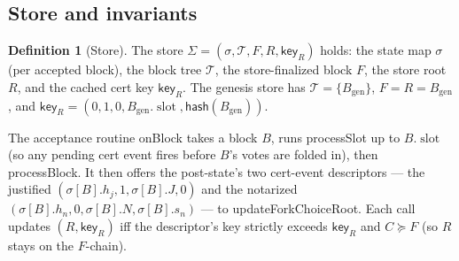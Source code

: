 \documentclass{article}
\newcommand{\genesis}{\ensuremath{B_{\mathrm{gen}}}}
\newcommand{\T}{\ensuremath{\mathcal{T}}}
\newcommand{\slot}{\operatorname{\mathrm{slot}}}
\newcommand{\hash}{\mathsf{hash}}
\newcommand{\key}{\mathsf{key}}
\newcommand{\processSlot}{\textsf{processSlot}\xspace}
\newcommand{\processBlock}{\textsf{processBlock}\xspace}
\newcommand{\onBlock}{\textsf{onBlock}\xspace}
\newcommand{\updateForkChoiceRoot}{\textsf{updateForkChoiceRoot}\xspace}
\theoremstyle{plain}
\theoremstyle{definition}
\newtheorem{definition}[theorem]{Definition}
\theoremstyle{remark}
\begin{document}
\subsection{Store and invariants}

\begin{definition}[Store]\label{def:store}
The store
\(
  \Sigma = (\sigma, \T, F, R, \key_R)
\)
holds: the state map $\sigma$ (per accepted block), the block tree $\T$, the store-finalized block $F$, the store root $R$, and the cached cert key $\key_R$. The genesis store has $\T = \{\genesis\}$, $F = R = \genesis$, and $\key_R = (0, 1, 0, \genesis.\slot, \hash(\genesis))$.
\end{definition}

The acceptance routine \onBlock takes a block $B$, runs \processSlot up to $B.\slot$ (so any pending cert event fires before $B$'s votes are folded in), then \processBlock. It then offers the post-state's two cert-event descriptors --- the justified $(\sigma[B].h_j, 1, \sigma[B].J, 0)$ and the notarized $(\sigma[B].h_n, 0, \sigma[B].N, \sigma[B].s_n)$ --- to \updateForkChoiceRoot. Each call updates $(R, \key_R)$ iff the descriptor's key strictly exceeds $\key_R$ and $C \succeq F$ (so $R$ stays on the $F$-chain).
\end{document}
